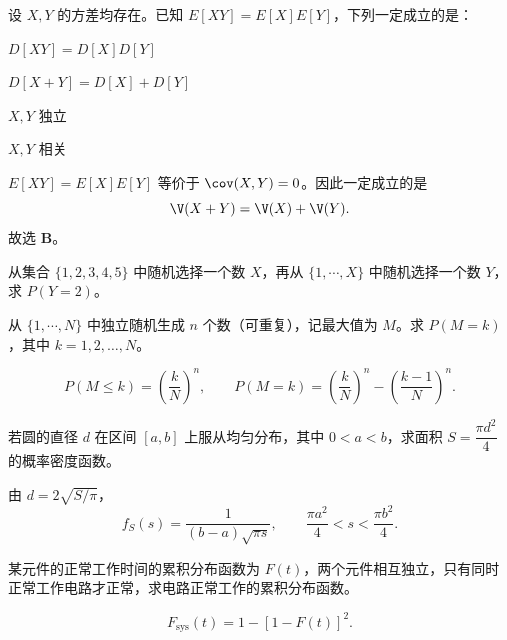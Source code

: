 
\begin{question}
设 $X,Y$ 的方差均存在。已知 $E[XY]=E[X]E[Y]$，下列一定成立的是：
\begin{choiceoptions}[2]
  \item $D[XY]=D[X]D[Y]$
  \item $D[X+Y]=D[X]+D[Y]$
  \item $X,Y$ 独立
  \item $X,Y$ 相关
\end{choiceoptions}
\begin{solution}
$E[XY]=E[X]E[Y]$ 等价于 $\cov(X,Y)=0$。因此一定成立的是
\[
\V(X+Y)=\V(X)+\V(Y).
\]
故选 \textbf{B}。
\end{solution}
\end{question}

\begin{question}
从集合 $\{1,2,3,4,5\}$ 中随机选择一个数 $X$，再从 $\{1,\cdots,X\}$ 中随机选择一个数 $Y$，求 $P(Y=2)$。
\begin{solution}
\end{solution}
\end{question}

\begin{question}
从 $\{1,\cdots,N\}$ 中独立随机生成 $n$ 个数（可重复），记最大值为 $M$。求 $P(M=k)$，其中 $k=1,2,\ldots,N$。
\begin{solution}
\[
P(M\le k)=\left(\frac{k}{N}\right)^n,
\qquad
P(M=k)=\left(\frac{k}{N}\right)^n-\left(\frac{k-1}{N}\right)^n.
\]
\end{solution}
\end{question}

\begin{question}
若圆的直径 $d$ 在区间 $[a,b]$ 上服从均匀分布，其中 $0<a<b$，求面积 $S=\dfrac{\pi d^2}{4}$ 的概率密度函数。
\begin{solution}
由 $d=2\sqrt{S/\pi}$，
\[
f_S(s)=\frac{1}{(b-a)\sqrt{\pi s}},
\qquad \frac{\pi a^2}{4}<s<\frac{\pi b^2}{4}.
\]
\end{solution}
\end{question}

\begin{question}
某元件的正常工作时间的累积分布函数为 $F(t)$，两个元件相互独立，只有同时正常工作电路才正常，求电路正常工作的累积分布函数。
\begin{solution}
\[
F_{\text{sys}}(t)=1-[1-F(t)]^2.
\]
\end{solution}
\end{question}


